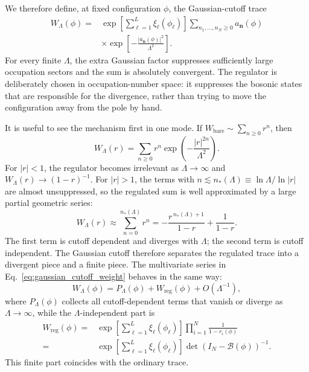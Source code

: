 \documentclass[twocolumn,aps,prb,10pt,amsmath,amssymb,amsthm,superscriptaddress]{revtex4-2}
\newcommand{\mc}[1]{\mathcal{#1}}
\newcommand{\bb}[1]{\bm{#1}}
\theoremstyle{remark}
\begin{document}
We therefore define, at fixed configuration $\phi$, the Gaussian-cutoff trace
\begin{equation}
\begin{aligned}
    W_{\Lambda}(\phi)
    ={}& \exp\!\left[\sum_{\ell=1}^{L}\xi_\ell(\phi_\ell)\right]
      \sum_{n_1,\dots,n_N\ge0} a_{\bb n}(\phi) \\
    &\times \exp\!\left[-\frac{|a_{\bb n}(\phi)|^2}{\Lambda^2}\right].
\end{aligned}
    \label{eq:gaussian_cutoff_weight}
\end{equation}
For every finite $\Lambda$, the extra Gaussian factor suppresses sufficiently large occupation sectors and the sum is absolutely convergent. The regulator is deliberately chosen in occupation-number space: it suppresses the bosonic states that are responsible for the divergence, rather than trying to move the configuration away from the pole by hand.

It is useful to see the mechanism first in one mode. If $W_{\mathrm{bare}}\sim \sum_{n\ge0} r^n$, then
\begin{equation}
    W_{\Lambda}(r)=\sum_{n\ge0} r^n \exp\!\left(-\frac{|r|^{2n}}{\Lambda^2}\right).
\end{equation}
For $|r|<1$, the regulator becomes irrelevant as $\Lambda\to\infty$ and $W_{\Lambda}(r)\to (1-r)^{-1}$. For $|r|>1$, the terms with $n\lesssim n_{*}(\Lambda)\equiv \ln\Lambda/\ln|r|$ are almost unsuppressed, so the regulated sum is well approximated by a large partial geometric series:
\begin{equation}
    W_{\Lambda}(r)\approx \sum_{n=0}^{n_{*}(\Lambda)} r^n
    = -\frac{r^{\,n_{*}(\Lambda)+1}}{1-r}+\frac{1}{1-r}.
\end{equation}
The first term is cutoff dependent and diverges with $\Lambda$; the second term is cutoff independent. The Gaussian cutoff therefore separates the regulated trace into a divergent piece and a finite piece. The multivariate series in Eq.~\eqref{eq:gaussian_cutoff_weight} behaves in the same way:
\begin{equation}
    W_{\Lambda}(\phi)
    = P_{\Lambda}(\phi)
    + W_{\mathrm{reg}}(\phi)
    + O(\Lambda^{-1}),
\end{equation}
where $P_{\Lambda}(\phi)$ collects all cutoff-dependent terms that vanish or diverge as $\Lambda\to\infty$, while the $\Lambda$-independent part is
\begin{equation}
\begin{aligned}
    W_{\mathrm{reg}}(\phi)
    ={}& \exp\!\left[\sum_{\ell=1}^{L}\xi_\ell(\phi_\ell)\right]
      \prod_{i=1}^{N}\frac{1}{1-r_i(\phi)} \\
    ={}& \exp\!\left[\sum_{\ell=1}^{L}\xi_\ell(\phi_\ell)\right]
      \det\!\left(I_N-\mc B(\phi)\right)^{-1}.
\end{aligned}
    \label{eq:reg_weight_appendix}
\end{equation}
This finite part coincides with the ordinary trace.
\end{document}
